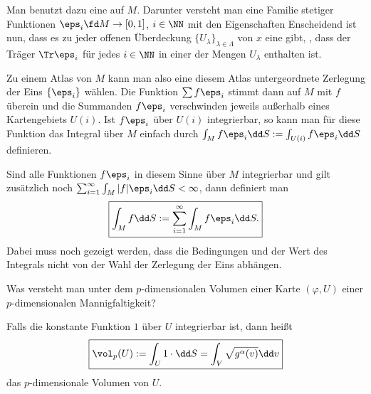\begin{antwort}
  Man benutzt dazu eine  auf $M$. 
  Darunter versteht man eine Familie stetiger 
  Funktionen $\eps_i\fd M\to [0,1]$, $i\in\NN$  mit den Eigenschaften
  Enscheidend ist nun, dass es zu jeder offenen Überdeckung 
  $\{U_\lambda\}_{\lambda\in\Lambda}$ von $x$ eine 
   gibt, {\dasheisst}, dass der 
  Träger $\Tr \eps_i$ für jedes $i\in\NN$ in einer der Mengen 
  $U_\lambda$ enthalten ist. 

  Zu einem Atlas von $M$ kann man also eine diesem Atlas untergeordnete 
  Zerlegung der Eins $\{ \eps_i\}$ wählen. Die Funktion $\sum f\eps_i$ 
  stimmt dann auf $M$ mit $f$ überein und die Summanden $f\eps_i$ 
  verschwinden jeweils außerhalb eines Kartengebiets $U(i)$. 
  Ist $f\eps_i$ über $U(i)$ integrierbar, so kann man für diese Funktion 
  das Integral über $M$ einfach durch 
  $\int_M f\eps_i \dd S := \int_{U(i)} f\eps_i \dd S$ definieren. 

  Sind alle Funktionen $f\eps_i$ in diesem Sinne über $M$ integrierbar 
  und gilt zusätzlich noch 
  $\sum_{i=1}^\infty \int_M |f| \eps_i \dd S < \infty$, dann 
  definiert man 
  \[
  \boxed{ 
    \int_M f \dd S := \sum_{i=1}^\infty \int_M f\eps_i \dd S.
  }
  \]
  Dabei muss noch gezeigt werden, dass die Bedingungen und der Wert des 
  Integrals nicht von der 
  Wahl der Zerlegung der Eins abhängen. 
  \AntEnd 
\end{antwort}

\begin{frage}\label{11_pdimvol}
  Was versteht man unter dem $p$-dimensionalen Volumen einer 
  Karte $(\varphi,U)$ einer $p$-dimensionalen Mannigfaltigkeit?
\end{frage}

\begin{antwort}
  Falls die konstante Funktion $1$ über $U$ integrierbar ist, dann heißt 
  \[\boxed{
    \vol_p (U) := \int_U 1\cdot \dd S = \int_V \sqrt{g^\alpha (v) } \dd v}
  \]
  das $p$-dimensionale Volumen von $U$. 
  \AntEnd
\end{antwort} 


